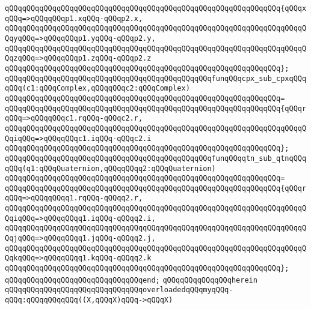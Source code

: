 \verb|qQQqqQQqqQQqqQQqqQQqqQQqqQQqqQQqqQQqqQQqqQQqqQQqqQQqqQQqqQQqqQQq{qQQqxqQQq=>qQQqqQQqp1.xqQQq-qQQqp2.x,|\newline
\verb|qQQqqQQqqQQqqQQqqQQqqQQqqQQqqQQqqQQqqQQqqQQqqQQqqQQqqQQqqQQqqQQqqQQqqQQqyqQQq=>qQQqqQQqp1.yqQQq-qQQqp2.y,|\newline
\verb|qQQqqQQqqQQqqQQqqQQqqQQqqQQqqQQqqQQqqQQqqQQqqQQqqQQqqQQqqQQqqQQqqQQqqQQqzqQQq=>qQQqqQQqp1.zqQQq-qQQqp2.z|\newline
\verb|qQQqqQQqqQQqqQQqqQQqqQQqqQQqqQQqqQQqqQQqqQQqqQQqqQQqqQQqqQQqqQQq};|\newline
\verb|qQQqqQQqqQQqqQQqqQQqqQQqqQQqqQQqqQQqqQQqqQQqqQQqfunqQQqcpx_sub_cpxqQQqqQQq(c1:qQQqComplex,qQQqqQQqc2:qQQqComplex)|\newline
\verb|qQQqqQQqqQQqqQQqqQQqqQQqqQQqqQQqqQQqqQQqqQQqqQQqqQQqqQQqqQQqqQQq=|\newline
\verb|qQQqqQQqqQQqqQQqqQQqqQQqqQQqqQQqqQQqqQQqqQQqqQQqqQQqqQQqqQQqqQQq{qQQqrqQQq=>qQQqqQQqc1.rqQQq-qQQqc2.r,|\newline
\verb|qQQqqQQqqQQqqQQqqQQqqQQqqQQqqQQqqQQqqQQqqQQqqQQqqQQqqQQqqQQqqQQqqQQqqQQqiqQQq=>qQQqqQQqc1.iqQQq-qQQqc2.i|\newline
\verb|qQQqqQQqqQQqqQQqqQQqqQQqqQQqqQQqqQQqqQQqqQQqqQQqqQQqqQQqqQQqqQQq};|\newline
\verb|qQQqqQQqqQQqqQQqqQQqqQQqqQQqqQQqqQQqqQQqqQQqqQQqfunqQQqqtn_sub_qtnqQQqqQQq(q1:qQQqQuaternion,qQQqqQQqq2:qQQqQuaternion)|\newline
\verb|qQQqqQQqqQQqqQQqqQQqqQQqqQQqqQQqqQQqqQQqqQQqqQQqqQQqqQQqqQQqqQQq=|\newline
\verb|qQQqqQQqqQQqqQQqqQQqqQQqqQQqqQQqqQQqqQQqqQQqqQQqqQQqqQQqqQQqqQQq{qQQqrqQQq=>qQQqqQQqq1.rqQQq-qQQqq2.r,|\newline
\verb|qQQqqQQqqQQqqQQqqQQqqQQqqQQqqQQqqQQqqQQqqQQqqQQqqQQqqQQqqQQqqQQqqQQqqQQqiqQQq=>qQQqqQQqq1.iqQQq-qQQqq2.i,|\newline
\verb|qQQqqQQqqQQqqQQqqQQqqQQqqQQqqQQqqQQqqQQqqQQqqQQqqQQqqQQqqQQqqQQqqQQqqQQqjqQQq=>qQQqqQQqq1.jqQQq-qQQqq2.j,|\newline
\verb|qQQqqQQqqQQqqQQqqQQqqQQqqQQqqQQqqQQqqQQqqQQqqQQqqQQqqQQqqQQqqQQqqQQqqQQqkqQQq=>qQQqqQQqq1.kqQQq-qQQqq2.k|\newline
\verb|qQQqqQQqqQQqqQQqqQQqqQQqqQQqqQQqqQQqqQQqqQQqqQQqqQQqqQQqqQQqqQQq};|\newline
\verb|qQQqqQQqqQQqqQQqqQQqqQQqqQQqqQQqend;|\newline
\verb|qQQqqQQqqQQqqQQqherein|\newline
\verb|qQQqqQQqqQQqqQQqqQQqqQQqqQQqqQQqoverloadedqQQqmyqQQq-qQQq:qQQqqQQqqQQq((X,qQQqX)qQQq->qQQqX)|\newline
